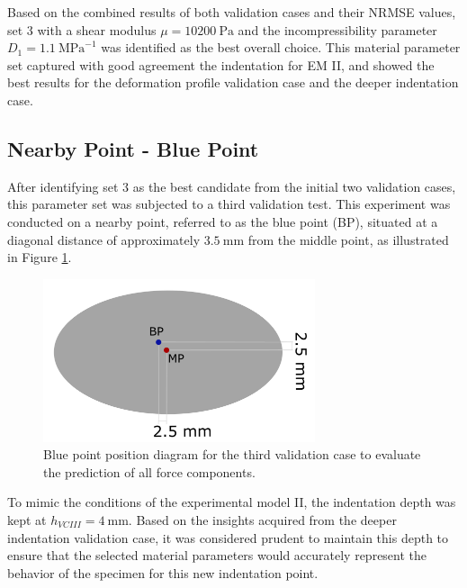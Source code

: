Based on the combined results of both validation cases and their NRMSE values, set 3 with a 
shear modulus $\mu=\SI{10200}{\pascal}$ and the incompressibility parameter $D_1=\SI{1.1}{\mega\pascal\tothe{-1}}$ 
was identified as the best overall choice. This material parameter set captured with good 
agreement the indentation for EM II, and showed the best results for the deformation profile 
validation case and the deeper indentation case.  

\subsection{Nearby Point - Blue Point}
\label{subsection:bluepoint}
After identifying set \SI{3}{} as the best candidate from the initial two validation cases, this 
parameter set was subjected to a third validation test. This experiment was conducted on a 
nearby point, referred to as the blue point (BP), situated at a diagonal distance of approximately $\SI{3.5}{\milli \meter}$ 
from the middle point, as illustrated in Figure \ref{fig:bluepointdiag}.\\%
\begin{figure}%
	\centering
   \quad
   \includegraphics[width=8cm]{Images/validationcase/bluepoint/bluepointdiag.png}%
   \caption[Blue point - Diagram]{Blue point position diagram for the third validation case to evaluate the prediction of all force components.}%
   \label{fig:bluepointdiag}%
\end{figure}
To mimic the conditions of the experimental model II, the indentation depth was kept at $h_{VCIII}=\SI{4}{\milli \meter}$.
Based on the insights acquired from the deeper indentation validation case, it was considered 
prudent to maintain this depth to ensure that the selected material parameters would accurately 
represent the behavior of the specimen for this new indentation point.\\

